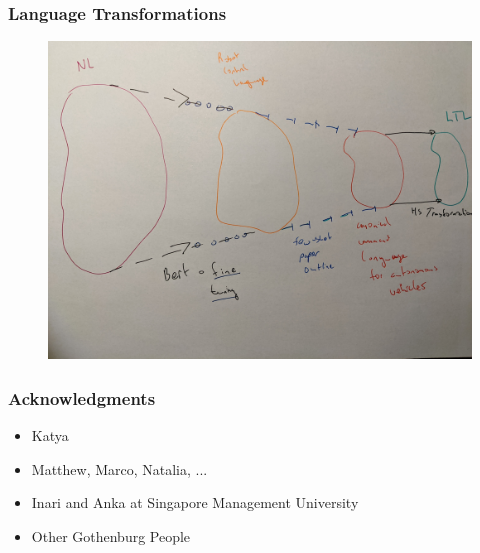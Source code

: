 \documentclass{beamer}
\begin{document}
\begin{frame}
\frametitle{Language Transformations}
\begin{figure}
\hspace*{-3mm}%
   \includegraphics[width= \paperwidth]{pics/three.jpg}
\end{figure}
\end{frame}


\begin{frame}
\frametitle{Acknowledgments}
\begin{itemize}[<+->]
\item Katya
\item Matthew, Marco, Natalia, ...
\item Inari and Anka at Singapore Management University
\item Other Gothenburg People
\end{itemize}

\end{frame}
\end{document}
